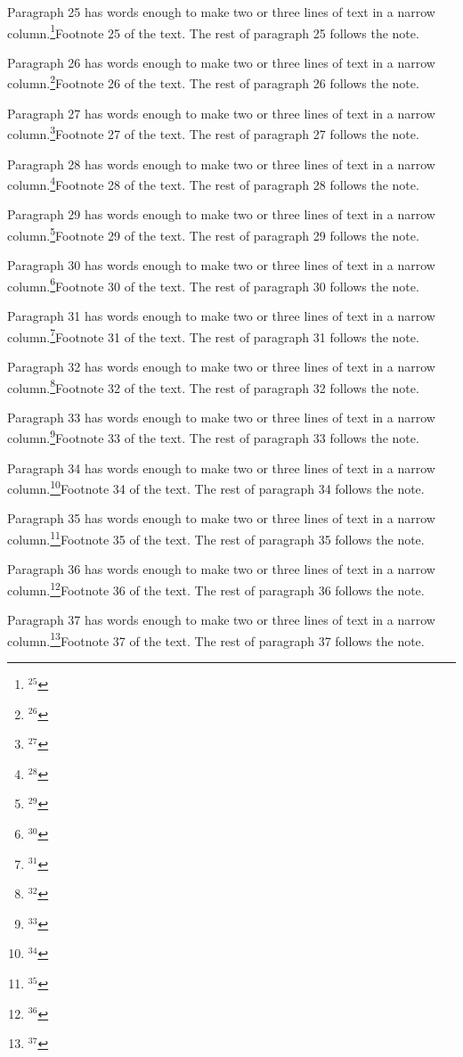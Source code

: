 Paragraph 25 has words enough to make two or three lines of text in a narrow column.\footnote{$^{25}$}{Footnote 25 of the text.} The rest of paragraph 25 follows the note.\par
Paragraph 26 has words enough to make two or three lines of text in a narrow column.\footnote{$^{26}$}{Footnote 26 of the text.} The rest of paragraph 26 follows the note.\par
Paragraph 27 has words enough to make two or three lines of text in a narrow column.\footnote{$^{27}$}{Footnote 27 of the text.} The rest of paragraph 27 follows the note.\par
Paragraph 28 has words enough to make two or three lines of text in a narrow column.\footnote{$^{28}$}{Footnote 28 of the text.} The rest of paragraph 28 follows the note.\par
Paragraph 29 has words enough to make two or three lines of text in a narrow column.\footnote{$^{29}$}{Footnote 29 of the text.} The rest of paragraph 29 follows the note.\par
Paragraph 30 has words enough to make two or three lines of text in a narrow column.\footnote{$^{30}$}{Footnote 30 of the text.} The rest of paragraph 30 follows the note.\par
Paragraph 31 has words enough to make two or three lines of text in a narrow column.\footnote{$^{31}$}{Footnote 31 of the text.} The rest of paragraph 31 follows the note.\par
Paragraph 32 has words enough to make two or three lines of text in a narrow column.\footnote{$^{32}$}{Footnote 32 of the text.} The rest of paragraph 32 follows the note.\par
Paragraph 33 has words enough to make two or three lines of text in a narrow column.\footnote{$^{33}$}{Footnote 33 of the text.} The rest of paragraph 33 follows the note.\par
Paragraph 34 has words enough to make two or three lines of text in a narrow column.\footnote{$^{34}$}{Footnote 34 of the text.} The rest of paragraph 34 follows the note.\par
Paragraph 35 has words enough to make two or three lines of text in a narrow column.\footnote{$^{35}$}{Footnote 35 of the text.} The rest of paragraph 35 follows the note.\par
Paragraph 36 has words enough to make two or three lines of text in a narrow column.\footnote{$^{36}$}{Footnote 36 of the text.} The rest of paragraph 36 follows the note.\par
Paragraph 37 has words enough to make two or three lines of text in a narrow column.\footnote{$^{37}$}{Footnote 37 of the text.} The rest of paragraph 37 follows the note.\par
